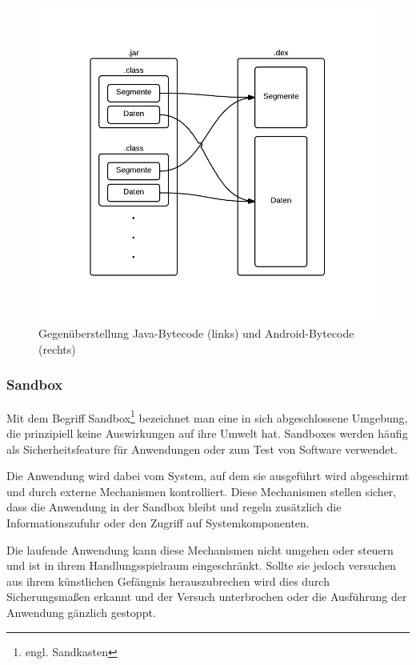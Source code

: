 \begin{figure}[h!t]
 \begin{center}
 \includegraphics[scale=0.5]{images/dexjar}
 \caption{Gegenüberstellung Java-Bytecode (links) und Android-Bytecode (rechts)}
 \label{dexjar}
 \end{center}
 \end{figure}
 
\subsubsection{Sandbox}
\label{sandbox}

Mit dem Begriff Sandbox\footnote{engl. Sandkasten} bezeichnet man eine in sich abgeschlossene Umgebung, die prinzipiell keine Auswirkungen auf ihre Umwelt hat. Sandboxes werden häufig als Sicherheitsfeature für Anwendungen oder zum Test von Software verwendet.

Die Anwendung wird dabei vom System, auf dem sie ausgeführt wird abgeschirmt und durch externe Mechanismen kontrolliert. Diese Mechanismen stellen sicher, dass die Anwendung in der Sandbox bleibt und regeln zusätzlich die Informationszufuhr oder den Zugriff auf Systemkomponenten.

Die laufende Anwendung kann diese Mechanismen nicht umgehen oder steuern und ist in ihrem Handlungsspielraum eingeschränkt. Sollte sie jedoch versuchen aus ihrem künstlichen Gefängnis herauszubrechen wird dies durch Sicherungsmaßen erkannt und der Versuch unterbrochen oder die Ausführung der Anwendung gänzlich gestoppt.

